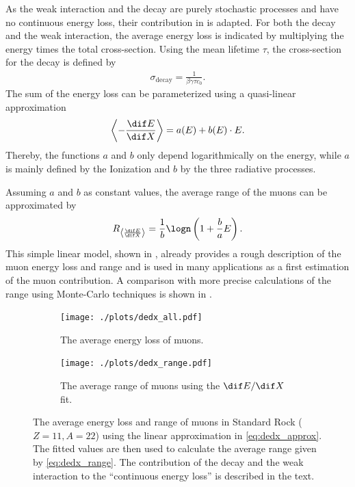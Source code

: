 As the weak interaction and the decay are purely stochastic processes and have no continuous energy loss, their contribution in  is adapted.
For both the decay and the weak interaction, the average energy loss is indicated by multiplying the energy times the total cross-section.
Using the mean lifetime $\tau$, the cross-section for the decay is defined by
\begin{align} \label{eq:sigma_decay}
    \sigma_{\text{decay}} = \frac{1}{\beta \gamma \tau c_0}.
\end{align}
The sum of the energy loss can be parameterized using a quasi-linear approximation
\begin{align} \label{eq:dedx_approx}
    \left\langle - \frac{\dif E}{\dif X} \right\rangle = a(E) + b(E) \cdot E.
\end{align}
Thereby, the functions $a$ and $b$ only depend logarithmically on the energy, while $a$ is mainly defined by the Ionization and $b$ by the three radiative processes.

Assuming $a$ and $b$ as constant values, the average range of the muons can be approximated by
\begin{align} \label{eq:dedx_range}
    R_{\left\langle \frac{\dif E}{\dif X} \right\rangle} = \frac{1}{b} \logn \left( 1 + \frac{b}{a} E \right).
\end{align}
This simple linear model, shown in , already provides a rough description of the muon energy loss and range and is used in many applications as a first estimation of the muon contribution.
A comparison with more precise calculations of the range using Monte-Carlo techniques is shown in .
\begin{figure}
    \centering
    \begin{subfigure}{0.9\textwidth}
        \centering
        \texttt{[image: ./plots/dedx\_all.pdf]}
        \caption{The average energy loss of muons.}
        \label{fig:dedx_all}
        \vspace{0.5cm}
    \end{subfigure}
    \begin{subfigure}{0.9\textwidth}
        \centering
        \texttt{[image: ./plots/dedx\_range.pdf]}
        \caption{The average range of muons using the $\dif E / \dif X$ fit.}
        \label{fig:dedx_range}
    \end{subfigure}
    \caption{The average energy loss and range of muons in Standard Rock ($Z=11, A=22$) using the linear approximation in \ref{eq:dedx_approx}. The fitted values are then used to calculate the average range given by \ref{eq:dedx_range}. The contribution of the decay and the weak interaction to the \enquote{continuous energy loss} is described in the text.}
    \label{fig:dedx}
\end{figure}

